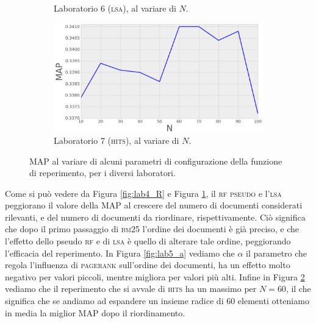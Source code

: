 \begin{figure}[t]
\begin{subfigure}{0.475\textwidth}
		\caption[]%
		{{\small Laboratorio 6 (\textsc{lsa}), al variare di $N$.}}    
		\label{fig:lab6_Nd}
	\end{subfigure}
	\quad
	\begin{subfigure}{0.475\textwidth}   
		\centering 
		\includegraphics[width=\textwidth]{figures/lab7_N.png}
		\caption[]%
		{{\small Laboratorio 7 (\textsc{hits}), al variare di $N$.}}    
		\label{fig:lab7_Nd}
	\end{subfigure}
        \caption[ The average and standard deviation of claboratorioritical parameters ]
        {\small MAP al variare di alcuni parametri di configurazione della funzione di reperimento, per i diversi laboratori.} 
        \label{fig:map_all}
\end{figure}

Come si pu\`o vedere da Figura \ref{fig:lab4_R} e Figura \ref{fig:lab6_Nd}, il \textsc{rf pseudo} e l'\textsc{lsa} peggiorano il valore della MAP al crescere del numero di documenti considerati rilevanti, e del numero di documenti da riordinare, rispettivamente. Ci\`o significa che dopo il primo passaggio di \textsc{bm25} l'ordine dei documenti \`e gi\`a preciso, e che l'effetto dello pseudo \textsc{rf} e di \textsc{lsa} \`e quello di alterare tale ordine, peggiorando l'efficacia del reperimento. In Figura \ref{fig:lab5_a} vediamo che $\alpha$ il parametro che regola l'influenza di \textsc{pagerank} sull'ordine dei documenti, ha un effetto molto negativo per valori piccoli, mentre migliora per valori pi\`u alti. Infine in Figura \ref{fig:lab7_Nd} vediamo che il reperimento che si avvale di \textsc{hits} ha un massimo per $N=60$, il che significa che se andiamo ad espandere un insieme radice di 60 elementi otteniamo in media la miglior MAP dopo il riordinamento.

